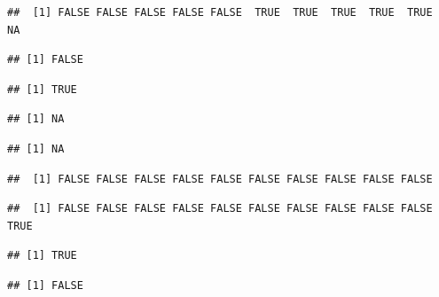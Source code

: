 \documentclass[krantz2]{krantz}\usepackage{knitr}%
\begin{document}
\begin{knitrout}\footnotesize
{}\color{fgcolor}\begin{kframe}
\begin{alltt}
 \hlkwb{<-}  \hlstd{)}
 \hlopt{>} 
\end{alltt}
\begin{verbatim}
##  [1] FALSE FALSE FALSE FALSE FALSE  TRUE  TRUE  TRUE  TRUE  TRUE    NA
\end{verbatim}
\begin{alltt}
 \hlopt{>} \hlstd{)}
\end{alltt}
\begin{verbatim}
## [1] FALSE
\end{verbatim}
\begin{alltt}
 \hlopt{>} \hlstd{)}
\end{alltt}
\begin{verbatim}
## [1] TRUE
\end{verbatim}
\begin{alltt}
 \hlopt{<} \hlstd{)}
\end{alltt}
\begin{verbatim}
## [1] NA
\end{verbatim}
\begin{alltt}
 \hlopt{>} \hlstd{)}
\end{alltt}
\begin{verbatim}
## [1] NA
\end{verbatim}
\begin{alltt}
\end{alltt}
\begin{verbatim}
##  [1] FALSE FALSE FALSE FALSE FALSE FALSE FALSE FALSE FALSE FALSE
\end{verbatim}
\begin{alltt}
\end{alltt}
\begin{verbatim}
##  [1] FALSE FALSE FALSE FALSE FALSE FALSE FALSE FALSE FALSE FALSE  TRUE
\end{verbatim}
\begin{alltt}
\hlstd{(}
\end{alltt}
\begin{verbatim}
## [1] TRUE
\end{verbatim}
\begin{alltt}
\hlstd{(}
\end{alltt}
\begin{verbatim}
## [1] FALSE
\end{verbatim}
\end{kframe}
\end{knitrout}
\end{document}
